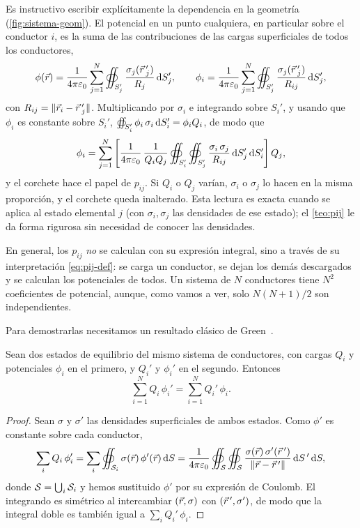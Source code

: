 \begin{observacion}\label{obs:pij-integral}
Es instructivo escribir explícitamente la dependencia en la geometría (\cref{fig:sistema-geom}). El potencial en un punto cualquiera, en
particular sobre el conductor $i$, es la suma de las contribuciones de las cargas superficiales de todos los conductores,
\[
  \phi(\vec{r})=\frac{1}{4\pi\varepsilon_{0}}\sum_{j=1}^{N}\oiint_{S_j'}\frac{\sigma_j(\vec{r}\,'_j)}{R_j}\,\mathrm{d} S_j',\qquad
  \phi_i=\frac{1}{4\pi\varepsilon_{0}}\sum_{j=1}^{N}\oiint_{S_j'}\frac{\sigma_j(\vec{r}\,'_j)}{R_{ij}}\,\mathrm{d} S_j' ,
\]
con $R_{ij}=\lVert \vec{r}_i-\vec{r}\,'_j\rVert$. Multiplicando por $\sigma_i$ e integrando sobre $S_i'$, y usando que $\phi_i$ es constante sobre $S_i'$,
$\oiint_{S_i'}\phi_i\,\sigma_i\,\mathrm{d} S_i'=\phi_iQ_i$, de modo que
\[
  \phi_i=\sum_{j=1}^{N}\left[\frac{1}{4\pi\varepsilon_{0}}\,\frac{1}{Q_iQ_j}\oiint_{S_i'}\oiint_{S_j'}\frac{\sigma_i\,\sigma_j}{R_{ij}}\,\mathrm{d} S_j'\,\mathrm{d} S_i'\right]Q_j ,
\]
y el corchete hace el papel de $p_{ij}$. Si $Q_i$ o $Q_j$ varían, $\sigma_i$ o $\sigma_j$ lo hacen en la misma proporción, y el corchete queda inalterado.
Esta lectura es exacta cuando se aplica al estado elemental $j$ (con $\sigma_i,\sigma_j$ las densidades de ese estado); el \cref{teo:pij} le da
forma rigurosa sin necesidad de conocer las densidades.
\end{observacion}

\begin{observacion}\label{obs:pij-practica}
En general, los $p_{ij}$ \emph{no} se calculan con su expresión integral, sino a través de su interpretación \cref{eq:pij-def}: se carga un conductor,
se dejan los demás descargados y se calculan los potenciales de todos. Un sistema de $N$ conductores tiene $N^{2}$ coeficientes de potencial, aunque,
como vamos a ver, solo $N(N+1)/2$ son independientes.
\end{observacion}

 Para demostrarlas necesitamos un resultado clásico de Green~\cite{GREEN}.

\begin{lema}\label{lem:reciprocidad}
Sean dos estados de equilibrio del mismo sistema de conductores, con cargas $Q_i$ y potenciales $\phi_i$ en el primero, y $Q_i'$ y $\phi_i'$ en el segundo.
Entonces
\begin{equation}\label{eq:reciprocidad}
  \sum_{i=1}^{N}Q_i\,\phi_i'=\sum_{i=1}^{N}Q_i'\,\phi_i .
\end{equation}
\end{lema}
\begin{proof}
Sean $\sigma$ y $\sigma'$ las densidades superficiales de ambos estados. Como $\phi'$ es constante sobre cada conductor,
\[
  \sum_iQ_i\,\phi_i'=\sum_i\oiint_{\mathcal{S}_i}\sigma(\vec{r})\,\phi'(\vec{r})\,\mathrm{d} S
  =\frac{1}{4\pi\varepsilon_{0}}\oiint_{\mathcal{S}}\oiint_{\mathcal{S}}\frac{\sigma(\vec{r})\,\sigma'(\vec{r}\,')}{\lVert \vec{r}-\vec{r}\,'\rVert}\,\mathrm{d} S\,'\,\mathrm{d} S ,
\]
donde $\mathcal{S}=\bigcup_i\mathcal{S}_i$ y hemos sustituido $\phi'$ por su expresión de Coulomb. El integrando es simétrico al intercambiar $(\vec{r},\sigma)$ con
$(\vec{r}\,',\sigma')$, de modo que la integral doble es también igual a $\sum_iQ_i'\,\phi_i$.
\end{proof}

